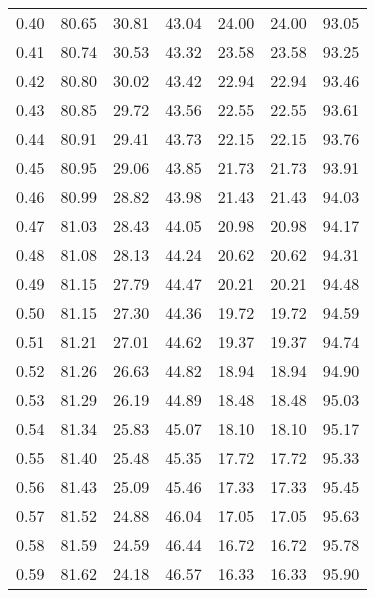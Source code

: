 \begin{tabular}{|c|c|c|c|c|c|c|}
      0.40 &     80.65 &     30.81 &      43.04 &   24.00 &      24.00 &         93.05 \\
      0.41 &     80.74 &     30.53 &      43.32 &   23.58 &      23.58 &         93.25 \\
      0.42 &     80.80 &     30.02 &      43.42 &   22.94 &      22.94 &         93.46 \\
      0.43 &     80.85 &     29.72 &      43.56 &   22.55 &      22.55 &         93.61 \\
      0.44 &     80.91 &     29.41 &      43.73 &   22.15 &      22.15 &         93.76 \\
      0.45 &     80.95 &     29.06 &      43.85 &   21.73 &      21.73 &         93.91 \\
      0.46 &     80.99 &     28.82 &      43.98 &   21.43 &      21.43 &         94.03 \\
      0.47 &     81.03 &     28.43 &      44.05 &   20.98 &      20.98 &         94.17 \\
      0.48 &     81.08 &     28.13 &      44.24 &   20.62 &      20.62 &         94.31 \\
      0.49 &     81.15 &     27.79 &      44.47 &   20.21 &      20.21 &         94.48 \\
      0.50 &     81.15 &     27.30 &      44.36 &   19.72 &      19.72 &         94.59 \\
      0.51 &     81.21 &     27.01 &      44.62 &   19.37 &      19.37 &         94.74 \\
      0.52 &     81.26 &     26.63 &      44.82 &   18.94 &      18.94 &         94.90 \\
      0.53 &     81.29 &     26.19 &      44.89 &   18.48 &      18.48 &         95.03 \\
      0.54 &     81.34 &     25.83 &      45.07 &   18.10 &      18.10 &         95.17 \\
      0.55 &     81.40 &     25.48 &      45.35 &   17.72 &      17.72 &         95.33 \\
      0.56 &     81.43 &     25.09 &      45.46 &   17.33 &      17.33 &         95.45 \\
      0.57 &     81.52 &     24.88 &      46.04 &   17.05 &      17.05 &         95.63 \\
      0.58 &     81.59 &     24.59 &      46.44 &   16.72 &      16.72 &         95.78 \\
      0.59 &     81.62 &     24.18 &      46.57 &   16.33 &      16.33 &         95.90 \\

\end{tabular}
